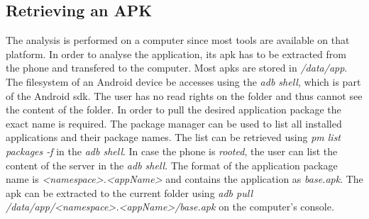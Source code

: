 \subsection{Retrieving an APK} \label{subsection:tools-apk}
The analysis is performed on a computer since most tools are available on that platform.
In order to analyse the application, its \gls{apk} has to be extracted from the phone and transfered to the computer.
\newline
Most \gls{apk}s are stored in \textit{/data/app}.
The filesystem of an Android device be accesses using the \textit{adb shell}, which is part of the Android \gls{sdk}.
The user has no read rights on the folder and thus cannot see the content of the folder.
In order to pull the desired application package the exact name is required.
The package manager can be used to list all installed applications and their package names.
The list can be retrieved using \textit{pm list packages -f} in the \textit{adb shell}.
In case the phone is \textit{rooted}, the user can list the content of the server in the \textit{adb shell}.
The format of the application package name is \textit{<namespace>.<appName>} and contains the application as \textit{base.apk}.
The \gls{apk} can be extracted to the current folder using \textit{adb pull /data/app/<namespace>.<appName>/base.apk} on the computer's console.
